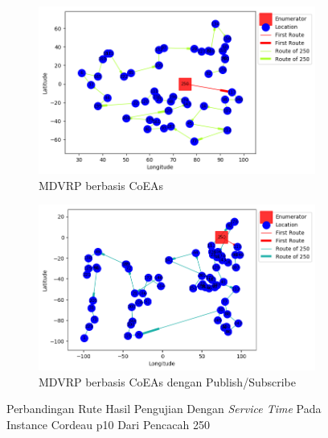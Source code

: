 \begin{figure}[H]
	\centering
	\begin{subfigure}[t]{\textwidth}
		\centering
		\includegraphics[width=\textwidth]{Resources/Images/cordeau_p10_tw/cordeau_p10_tw_250_coes}
		\caption{MDVRP berbasis CoEAs}
		\label{fig:cordeau_p10_tw_250_coes}
	\end{subfigure}
	\begin{subfigure}[t]{\textwidth}
		\centering
		\includegraphics[width=\textwidth]{Resources/Images/cordeau_p10_tw/cordeau_p10_tw_250_pubsub_coes}
		\caption{MDVRP berbasis CoEAs dengan Publish/Subscribe}
		\label{fig:cordeau_p10_tw_250_pubsub_coes}
	\end{subfigure}
	\caption{Perbandingan Rute Hasil Pengujian Dengan \textit{Service Time} Pada Instance Cordeau p10 Dari Pencacah 250}
	\label{fig:cordeau_p10_tw_250}
\end{figure}


